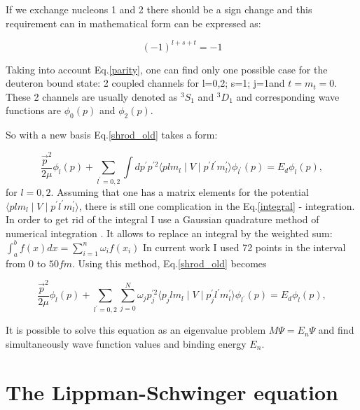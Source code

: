    If we exchange nucleons 1 and 2 there should be a sign change and this requirement 
    can in mathematical form can be expressed as:

    \begin{equation}
        (-1)^{l+s+t} = -1
        \label{parity}
    \end{equation}

    Taking into account Eq.\ref{parity}, one can find only one possible case for 
    the deuteron bound state: 2 coupled channels for l=0,2; s=1; j=1and $t = m_t = 0$. 
    These 2 channels are usually denoted as $^3S_1$ and $^3D_1$ and
    corresponding wave functions are $\phi_0(p)$ and $\phi_2(p)$. 

    So with a new basis Eq.\ref{shrod_old} takes a form:

    \begin{equation}
        \frac{\vec{p}^2}{2\mu} \phi_l(p) +
        \sum_{l^\prime =0,2} \int d p^\prime p^{\prime 2} 
        \langle plm_l \mid V \mid p^\prime l^\prime m_l^\prime  \rangle
        \phi_{l^\prime}(p) = 
        E_d \phi_l(p),
        \label{integral}
    \end{equation}
    for $l=0,2$. Assuming that one has a matrix elements for the potential 
    $\langle plm_l \mid V \mid p^\prime l^\prime m_l^\prime  \rangle$,
    there is still one complication in the Eq.\ref{integral} - integration.
    In order to get rid of the integral I use a Gaussian quadrature 
    method of numerical integration \cite{jacobi1826ueber}.
    It allows to replace an integral by the weighted sum:
        $\int_a^b f(x)dx = \sum_{i=1}^n \omega_i f(x_i)$
    In current work I used 72 points in the interval from $0$ to $50 fm$. 
    Using this method, Eq.\ref{shrod_old} becomes  

    
    \begin{equation}
        \frac{\vec{p}^2}{2\mu} \phi_l(p) +
        \sum_{l^\prime =0,2}\sum_{j =0}^N  \omega_j p^{\prime 2}_j \langle p_jlm_l \mid V \mid p^\prime_j l^\prime m_l^\prime  \rangle
        \phi_{l^\prime}(p) = 
        E_d \phi_l(p),
        \label{integral2}
    \end{equation}

    It is possible to solve this equation as an eigenvalue problem $M\Psi = E_n \Psi$ and
    find simultaneously wave function values and binding energy $E_n$.

\section{The Lippman-Schwinger equation}


